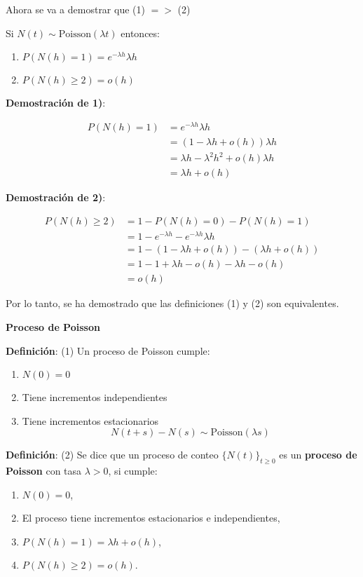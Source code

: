 \documentclass[12pt,a4paper]{article}
\newcommand{\definicion}[1]{%
\begin{definicionbox}
\textbf{Definición}: #1
\end{definicionbox}
}
\begin{document}
Ahora se va a demostrar que (1) $= >$ (2)

Si $N(t) \sim \text{Poisson}(\lambda t)$ entonces:

\begin{enumerate}
    \item $P(N(h)=1) = e^{-\lambda h} \lambda h$
    \item $P(N(h) \geq 2) = o(h)$
\end{enumerate}

\textbf{Demostración de 1)}:

\begin{align*}
P(N(h)=1) &= e^{-\lambda h} \lambda h \\
&= (1 - \lambda h + o(h)) \lambda h \\
&= \lambda h - \lambda^2 h^2 + o(h) \lambda h \\
&= \lambda h + o(h)
\end{align*}

\textbf{Demostración de 2)}:

\begin{align*}
P(N(h) \geq 2) &= 1 - P(N(h)=0) - P(N(h)=1) \\
&= 1 - e^{-\lambda h} - e^{-\lambda h} \lambda h \\
&= 1 - (1 - \lambda h + o(h)) - (\lambda h + o(h)) \\
&= 1 - 1 + \lambda h - o(h) - \lambda h - o(h) \\
&= o(h)
\end{align*}

Por lo tanto, se ha demostrado que las definiciones (1) y (2) son equivalentes.


\textbf{Proceso de Poisson}

\definicion{
(1) Un proceso de Poisson cumple:
\begin{enumerate}
    \item $N(0) = 0$
    \item Tiene incrementos independientes
    \item Tiene incrementos estacionarios
    \begin{equation*}
    N(t+s) - N(s) \sim \text{Poisson}(\lambda s)
    \end{equation*}
\end{enumerate}
}

\definicion{(2) Se dice que un proceso de conteo $\{N(t)\}_{t \geq 0}$ es un \textbf{proceso de Poisson} con tasa $\lambda > 0$, si cumple:
\begin{enumerate}
    \item $N(0) = 0$,
    \item El proceso tiene incrementos estacionarios e independientes,
    \item $P(N(h) = 1) = \lambda h + o(h)$,
    \item $P(N(h) \geq 2) = o(h)$.
\end{enumerate}}
\end{document}
